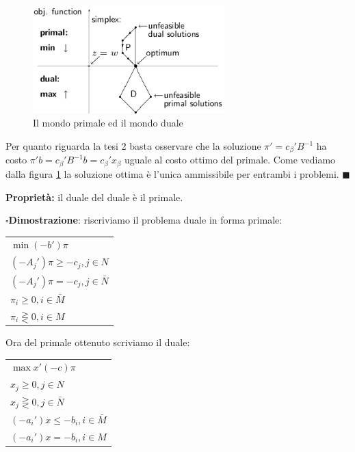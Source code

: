 \documentclass[11pt]{book}
\begin{document}
\begin{figure}[h!]
  \centering
  \includegraphics[width=0.66\textwidth]{images/cap5fig55.png}
  \caption{Il mondo primale ed il mondo duale}
  \label{cap5fig55}
\end{figure}

Per quanto riguarda la tesi 2 basta osservare che la soluzione $\pi' =
c_\beta'B^{-1}$ ha costo $\pi'b = c_\beta'B^{-1}b = c_\beta'x_\beta$
uguale al costo ottimo del primale. Come vediamo dalla figura
\ref{cap5fig55} la soluzione ottima \`e l'unica ammissibile per
entrambi i problemi. $\blacksquare$
\vspace{11pt}

{\bf Propriet\`a:} il duale del duale \`e il primale.

\vspace{11pt} $\square${\bf Dimostrazione}: riscriviamo il problema
duale in forma primale:

\vspace{11pt}
\begin{center}
\begin{tabular}{l}
$\min (-b')\pi$\\
$(-A_j')\pi \geq -c_j, j \in N$\\
$(-A_j')\pi = -c_j, j \in \bar{N}$\\
$\pi_i \geq 0, i \in \bar{M}$\\
$\pi_i \gtreqless 0, i \in M$\\
\end{tabular}
\end{center}
\vspace{11pt}

Ora del primale ottenuto scriviamo il duale:

\vspace{11pt}
\begin{center}
\begin{tabular}{l}
$\max x'(-c)\pi$\\
$x_j \geq 0, j \in N$\\
$x_j \gtreqless 0, j \in \bar{N}$\\
$(-a_i')x \leq -b_i, i \in \bar{M}$\\
$(-a_i')x = -b_i, i \in M$\\
\end{tabular}
\end{center}
\vspace{11pt}
\end{document}
